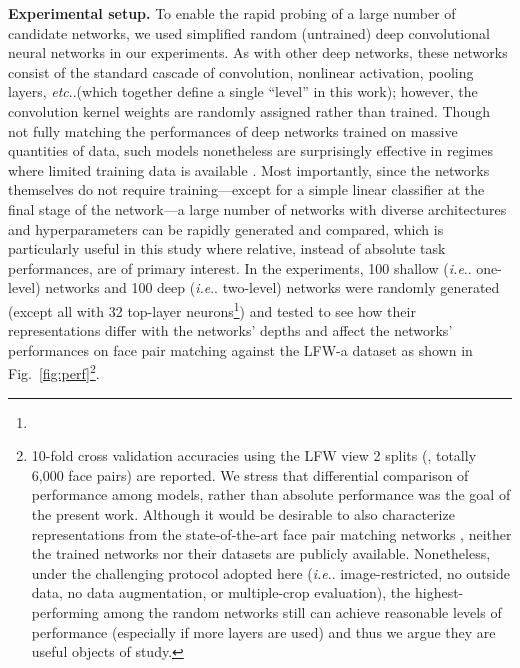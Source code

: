 \documentclass[fleqn]{article} %
\makeatletter
\DeclareRobustCommand\onedot{\futurelet\@let@token\@onedot}
\def\@onedot{\ifx\@let@token.\else.\null\fi\xspace}
\def\eg{\emph{e.g}\onedot} \def\Eg{\emph{E.g}\onedot}
\def\ie{\emph{i.e}\onedot} \def\Ie{\emph{I.e}\onedot}
\def\etc{\emph{etc}\onedot} \def\vs{\emph{vs}\onedot}
\makeatother
\begin{document}
\newcommand{\expperf}{10-fold cross validation accuracies using the LFW view 2 splits (\cite{LFWTech}, totally 6,000 face pairs) are reported.
We stress that differential comparison of performance among models, rather than absolute performance was the goal of the present work.
Although it would be desirable to also characterize representations from the state-of-the-art face pair matching networks \cite{taigman2014deepface, sun2014deep, schroff2015facenet}, neither the trained networks nor their datasets are publicly available.
Nonetheless, under the challenging protocol adopted here (\ie image-restricted, no outside data, no data augmentation, or multiple-crop evaluation), the highest-performing among the random networks still can achieve reasonable levels of performance (especially if more layers are used) and thus we argue they are useful objects of study. 
} 

{\bf Experimental setup.}
To enable the rapid probing of a large number of candidate networks, we used simplified random (untrained) deep convolutional neural networks \cite{cox2011beyond, sthor} in our experiments.
As with other deep networks, these networks consist of the standard cascade of convolution, nonlinear activation, pooling layers, \etc (which together define a single ``level'' in this work); however, the convolution kernel weights are randomly assigned rather than trained.
Though not fully matching the performances of deep networks trained on massive quantities of data, such models nonetheless are surprisingly effective in regimes where limited training data is available \cite{cox2011beyond, yamins2014performance}. %
Most importantly, since the networks themselves do not require training---except for a simple linear classifier at the final stage of the network---a large number of networks with diverse architectures and hyperparameters can be rapidly generated and compared, which is particularly useful in this study where relative, instead of absolute task performances, are of primary interest.
In the experiments, 100 shallow (\ie one-level) networks and 100 deep (\ie two-level) networks {were} randomly generated (except all with 32 top-layer neurons\footnote{\expsettings}) and tested to see how their representations differ with the networks' depths and affect the networks' performances on face pair matching against the LFW-a dataset \cite{wolf2011effective} as shown in Fig.~\ref{fig:perf}\footnote{\expperf}.
\end{document}
